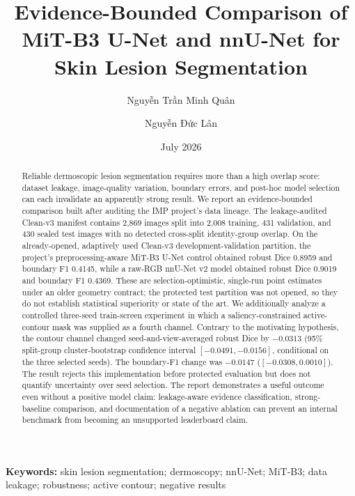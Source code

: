 \documentclass[11pt]{article}
\title{Evidence-Bounded Comparison of MiT-B3 U-Net and nnU-Net for Skin Lesion Segmentation}
\author{Nguyễn Trần Minh Quân \and Nguyễn Đức Lân}
\date{July 2026}
\newcommand{\cleanv}{Clean-v3}
\begin{document}
\maketitle

\begin{abstract}
Reliable dermoscopic lesion segmentation requires more than a high overlap score: dataset leakage, image-quality variation, boundary errors, and post-hoc model selection can each invalidate an apparently strong result. We report an evidence-bounded comparison built after auditing the IMP project's data lineage. The leakage-audited \cleanv{} manifest contains 2,869 images split into 2,008 training, 431 validation, and 430 sealed test images with no detected cross-split identity-group overlap. On the already-opened, adaptively used \cleanv{} development-validation partition, the project's preprocessing-aware MiT-B3 U-Net control obtained robust Dice 0.8959 and boundary F1 0.4145, while a raw-RGB nnU-Net v2 model obtained robust Dice 0.9019 and boundary F1 0.4369. These are selection-optimistic, single-run point estimates under an older geometry contract; the protected test partition was not opened, so they do not establish statistical superiority or state of the art. We additionally analyze a controlled three-seed train-screen experiment in which a saliency-constrained active-contour mask was supplied as a fourth channel. Contrary to the motivating hypothesis, the contour channel changed seed-and-view-averaged robust Dice by $-0.0313$ (95\% split-group cluster-bootstrap confidence interval $[-0.0491,-0.0156]$, conditional on the three selected seeds). The boundary-F1 change was $-0.0147$ ($[-0.0308,0.0010]$). The result rejects this implementation before protected evaluation but does not quantify uncertainty over seed selection. The report demonstrates a useful outcome even without a positive model claim: leakage-aware evidence classification, strong-baseline comparison, and documentation of a negative ablation can prevent an internal benchmark from becoming an unsupported leaderboard claim.
\end{abstract}

\noindent\textbf{Keywords:} skin lesion segmentation; dermoscopy; nnU-Net; MiT-B3; data leakage; robustness; active contour; negative results














\end{document}
